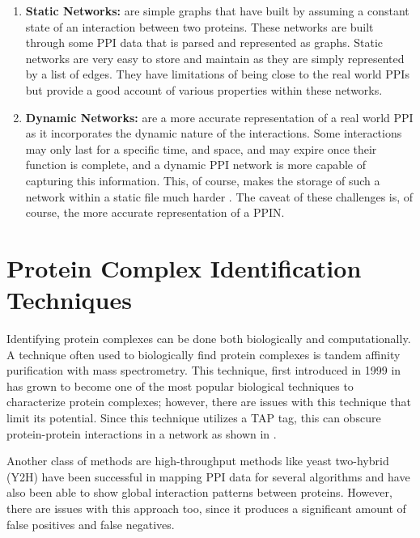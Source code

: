 \begin{enumerate}
    \item \textbf{Static Networks:} are simple graphs that have built by assuming 
    a constant state of an interaction between two proteins. These networks are 
    built through some PPI data that is parsed and represented as graphs. Static 
    networks are very easy to store and maintain as they are simply represented by a list of edges. They have limitations of being close to the real world PPIs but provide a good account of various properties within these networks.
    \item \textbf{Dynamic Networks:} are a more accurate representation of a real world PPI as it incorporates the dynamic nature of the interactions. Some interactions may only last for a specific time, and space, and may expire once their function is complete, and a dynamic PPI network is more capable of capturing this information. \cite{chen_identifying_2014} This, of course, makes the storage of such a network within a static file much harder \cite{chen_identifying_2014}. The caveat of these challenges is, of course, the more accurate representation of a PPIN.
\end{enumerate}

\section{Protein Complex Identification Techniques}
Identifying protein complexes can be done both biologically and computationally. A technique often used to biologically find protein complexes is tandem affinity purification with mass 
spectrometry. This technique, first introduced in 1999 in \cite{rigaut_generic_1999} has grown to become one of the most 
popular biological techniques to characterize protein complexes; however, there are issues 
with this technique that limit its potential. Since this technique utilizes a 
TAP tag, this can obscure protein-protein interactions in a network as shown in \cite{puig_tandem_2001}.

Another class of methods are high-throughput methods like yeast two-hybrid (Y2H) \cite{young_yeast_1998} have been 
successful in mapping PPI data for several algorithms and have also been able to show global
interaction patterns between proteins. However, there are issues with this approach too, since 
it produces a significant amount of false positives and false negatives. 

